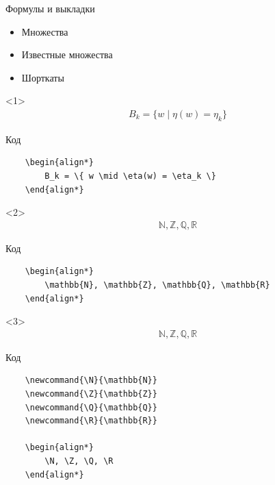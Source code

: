 \begin{frame}[fragile]{Формулы и выкладки}

\begin{itemize}[<+->]
    \item Множества
    \item Известные множества
    \item Шорткаты
\end{itemize}

\begin{onlyenv}<1>
    \begin{align*}
        B_k = \{ w \mid \eta(w) = \eta_k \}
    \end{align*}
    
    \begin{block}{Код}
        \begin{lstlisting}
    \begin{align*}
        B_k = \{ w \mid \eta(w) = \eta_k \}
    \end{align*}
        \end{lstlisting}
    \end{block}
\end{onlyenv}

\begin{onlyenv}<2>
    \begin{align*}
        \mathbb{N}, \mathbb{Z}, \mathbb{Q}, \mathbb{R}
    \end{align*}
    
    \begin{block}{Код}
        \begin{lstlisting}
    \begin{align*}
        \mathbb{N}, \mathbb{Z}, \mathbb{Q}, \mathbb{R}
    \end{align*}
        \end{lstlisting}
    \end{block}
\end{onlyenv}

\begin{onlyenv}<3>
    \vspace{-0.7cm}
    {
        \newcommand{\N}{\mathbb{N}}
        \newcommand{\Z}{\mathbb{Z}}
        \newcommand{\Q}{\mathbb{Q}}
        \newcommand{\R}{\mathbb{R}}
        \begin{align*}
            \N, \Z, \Q, \R
        \end{align*}
    }
    
    \begin{block}{Код}
        \begin{lstlisting}
    \newcommand{\N}{\mathbb{N}}
    \newcommand{\Z}{\mathbb{Z}}
    \newcommand{\Q}{\mathbb{Q}}
    \newcommand{\R}{\mathbb{R}}
    
    \begin{align*}
        \N, \Z, \Q, \R
    \end{align*}
        \end{lstlisting}
    \end{block}
\end{onlyenv}

\end{frame}
